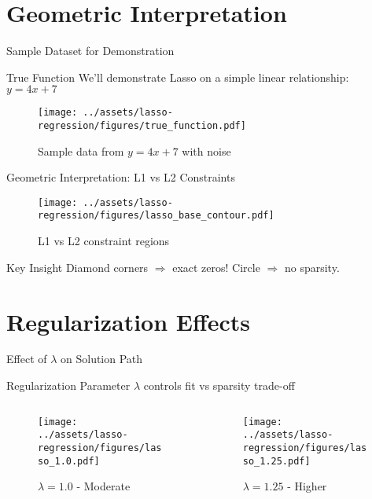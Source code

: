 \documentclass{beamer}
\begin{document}
\section{Geometric Interpretation}

\begin{frame}{Sample Dataset for Demonstration}
\begin{examplebox}{True Function}
We'll demonstrate Lasso on a simple linear relationship: $y = 4x + 7$
\end{examplebox}

\begin{figure}
    \centering
    \texttt{[image: ../assets/lasso-regression/figures/true\_function.pdf]}
    \caption{{\footnotesize Sample data from $y = 4x + 7$ with noise}}
    \label{fig:my_label}
\end{figure}
\end{frame}

\begin{frame}{Geometric Interpretation: L1 vs L2 Constraints}
\begin{figure}
    \centering
    \texttt{[image: ../assets/lasso-regression/figures/lasso\_base\_contour.pdf]}
    \caption{{\footnotesize L1 vs L2 constraint regions}}
    \label{fig:my_label}
\end{figure}

\begin{keypointsbox}{Key Insight}
{\footnotesize
Diamond corners $\Rightarrow$ exact zeros! Circle $\Rightarrow$ no sparsity.
}
\end{keypointsbox}
\end{frame}

\section{Regularization Effects}

\begin{frame}{Effect of $\lambda$ on Solution Path}
\begin{alertbox}{Regularization Parameter}
$\lambda$ controls fit vs sparsity trade-off
\end{alertbox}

\begin{columns}
\begin{column}{0.5\textwidth}
\begin{figure}
\texttt{[image: ../assets/lasso-regression/figures/lasso\_1.0.pdf]}
\caption{{\footnotesize $\lambda = 1.0$ - Moderate}}
\end{figure}
\end{column}
\begin{column}{0.5\textwidth}
\begin{figure}
\texttt{[image: ../assets/lasso-regression/figures/lasso\_1.25.pdf]}
\caption{{\footnotesize $\lambda = 1.25$ - Higher}}
\end{figure}
\end{column}
\end{columns}
\end{frame}
\end{document}
